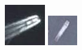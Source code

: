 \begin{figure}[H]
	\centering
	\begin{minipage}{0.3\linewidth}
		\includegraphics[width=\linewidth]{figure/bridge_47_cutted_object_1.png}
	\end{minipage}
	\begin{minipage}{0.3\linewidth}
		\includegraphics[width=\linewidth]{figure/bridge_48_cutted_object_1.png}

\end{minipage}
\end{figure}
